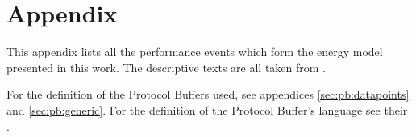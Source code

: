 \appendix
\appendixpage
\addappheadtotoc

\renewcommand\thesection{\Alph{section}}
\chapter{Appendix}

\label{appendix:chosen-events}

This appendix lists all the performance events which form the energy model
presented in this work. The descriptive texts are all taken from
\cite{intel2011events}.





\label{sec:fmt:datapoints}
For the definition of the Protocol Buffers used, see appendices
\ref{sec:pb:datapoints} and \ref{sec:pb:generic}. For the definition of the
Protocol Buffer's language see their
.



\label{sec:pb:generic}


\label{sec:pb:datapoints}


\label{sec:pb:counter-files}

